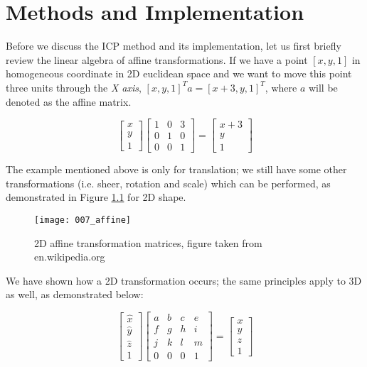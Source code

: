 \documentclass[../structure.tex]{subfiles}
\begin{document}
\chapter{Methods and Implementation}
\hspace{2em}Before we discuss the ICP method and its implementation, let us first briefly review the linear algebra of affine transformations. If we have a point $[x,y,1]$ in homogeneous coordinate in 2D euclidean space and we want to move this point three units through the \textit{X axis}, $[x,y,1]^T a = [x+3,y,1]^T$, where $a$ will be  denoted as the affine matrix.

\begin{equation*}
\begin{bmatrix}
x \\ y \\ 1
\end{bmatrix}
\begin{bmatrix}
1 & 0 & 3 \\
0 & 1 & 0 \\
0 & 0 & 1
\end{bmatrix}
=
\begin{bmatrix}
x + 3 \\ y \\ 1
\end{bmatrix}
\end{equation*}

The example mentioned above is only for translation; we still have some other transformations (i.e. sheer, rotation and scale) which can be performed, as demonstrated in Figure \ref{fig:affine} for 2D shape.

\begin{figure}[h!]
\centering
\texttt{[image: 007\_affine]}
\captionsetup{justification=centering}
\caption{2D affine transformation matrices, figure taken from en.wikipedia.org}
\label{fig:affine}
\end{figure}

We have shown how a 2D transformation occurs; the same principles apply to 3D as well, as demonstrated below:

\begin{equation*}
\begin{bmatrix}
\hat{x} \\ \hat{y} \\ \hat{z} \\ 1
\end{bmatrix}
\begin{bmatrix}
a & b & c & e\\
f & g & h & i\\
j & k & l & m\\
0 & 0 & 0 & 1
\end{bmatrix}
=
\begin{bmatrix}
x \\ y \\ z \\ 1
\end{bmatrix}
\end{equation*}
\end{document}
